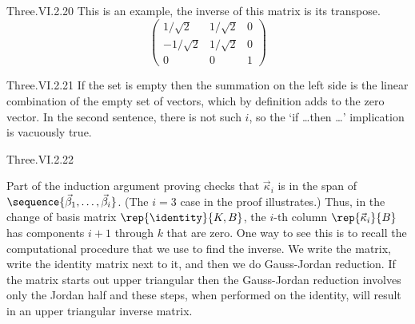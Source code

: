 \begin{ans}{Three.VI.2.20}
      This is an example, the inverse of this matrix is its transpose.
      \begin{equation*}
        \begin{pmatrix}
          1/\sqrt{2}  &1/\sqrt{2}  &0  \\
         -1/\sqrt{2}  &1/\sqrt{2}  &0  \\
          0           &0           &1
        \end{pmatrix}
      \end{equation*}
    
\end{ans}
\begin{ans}{Three.VI.2.21}
      If the set is empty then the summation on the left side is the
      linear combination of the empty set of vectors,
      which by definition adds to the zero vector.
      In the second sentence, there is not such $i$, so the
      `if \ldots then \ldots' implication is vacuously true.
    
\end{ans}
\begin{ans}{Three.VI.2.22}
      \begin{exparts}
        \partsitem Part of the induction argument proving
           checks that
          $\vec{\kappa}_i$ is in the span of
          $\sequence{\vec{\beta}_1,\dots,\vec{\beta}_i}$.
          (The $i=3$ case in the proof illustrates.)
          Thus, in the change of basis matrix $\rep{\identity}{K,B}$,
          the $i$-th column $\rep{\vec{\kappa}_i}{B}$
          has components $i+1$ through $k$ that are zero.
        \partsitem One way to see this is to recall the computational
          procedure that we use to find the inverse.
          We write the matrix, write the identity matrix next to
          it, and then we do Gauss-Jordan reduction.
          If the matrix starts out upper triangular then the Gauss-Jordan
          reduction involves only the Jordan half and these steps,
          when performed on the identity, will result in an upper triangular
          inverse matrix.
      \end{exparts}
    
\end{ans}
